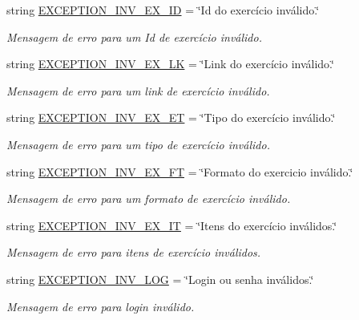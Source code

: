 \begin{DoxyCompactItemize}
string \hyperlink{namespaceELO_1_1lang_1_1pt__br_a26cc4a6ca49a15bea42f865747e09baf}{E\-X\-C\-E\-P\-T\-I\-O\-N\-\_\-\-I\-N\-V\-\_\-\-E\-X\-\_\-\-I\-D} = \char`\"{}Id do exercício inválido.\char`\"{}
\begin{DoxyCompactList}\small\item\em Mensagem de erro para um Id de exercício inválido. \end{DoxyCompactList}\item 
string \hyperlink{namespaceELO_1_1lang_1_1pt__br_a9b39683aa5ba44aa338ad65b77c7fb2b}{E\-X\-C\-E\-P\-T\-I\-O\-N\-\_\-\-I\-N\-V\-\_\-\-E\-X\-\_\-\-L\-K} = \char`\"{}Link do exercício inválido.\char`\"{}
\begin{DoxyCompactList}\small\item\em Mensagem de erro para um link de exercício inválido. \end{DoxyCompactList}\item 
string \hyperlink{namespaceELO_1_1lang_1_1pt__br_a9094729b169752160fa1dc35eb24396c}{E\-X\-C\-E\-P\-T\-I\-O\-N\-\_\-\-I\-N\-V\-\_\-\-E\-X\-\_\-\-E\-T} = \char`\"{}Tipo do exercício inválido.\char`\"{}
\begin{DoxyCompactList}\small\item\em Mensagem de erro para um tipo de exercício inválido. \end{DoxyCompactList}\item 
string \hyperlink{namespaceELO_1_1lang_1_1pt__br_a835074107c62868614d30f665fef7ae8}{E\-X\-C\-E\-P\-T\-I\-O\-N\-\_\-\-I\-N\-V\-\_\-\-E\-X\-\_\-\-F\-T} = \char`\"{}Formato do exercicio inválido.\char`\"{}
\begin{DoxyCompactList}\small\item\em Mensagem de erro para um formato de exercício inválido. \end{DoxyCompactList}\item 
string \hyperlink{namespaceELO_1_1lang_1_1pt__br_a4bf29d17d3f0b2efa5cfa59a17a72850}{E\-X\-C\-E\-P\-T\-I\-O\-N\-\_\-\-I\-N\-V\-\_\-\-E\-X\-\_\-\-I\-T} = \char`\"{}Itens do exercício inválidos.\char`\"{}
\begin{DoxyCompactList}\small\item\em Mensagem de erro para itens de exercício inválidos. \end{DoxyCompactList}\item 
string \hyperlink{namespaceELO_1_1lang_1_1pt__br_a5b035d65858f7603a39f3e86362ef997}{E\-X\-C\-E\-P\-T\-I\-O\-N\-\_\-\-I\-N\-V\-\_\-\-L\-O\-G} = \char`\"{}Login ou senha inválidos.\char`\"{}
\begin{DoxyCompactList}\small\item\em Mensagem de erro para login inválido. \end{DoxyCompactList}\end{DoxyCompactItemize}



